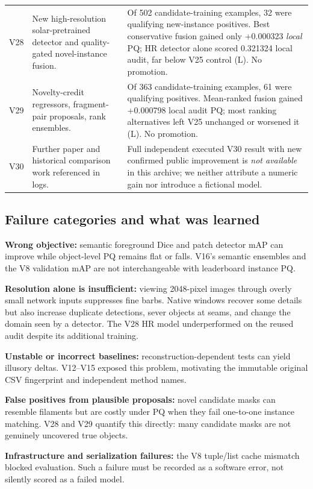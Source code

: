 \documentclass[11pt,a4paper]{article}
\begin{document}
\begin{longtable}{p{}p{}p{}}
V28 & New high-resolution solar-pretrained detector and quality-gated novel-instance fusion. & Of 502 candidate-training examples, 32 were qualifying new-instance positives. Best conservative fusion gained only +0.000323 \emph{local} PQ; HR detector alone scored 0.321324 local audit, far below V25 control (L). No promotion.\\
V29 & Novelty-credit regressors, fragment-pair proposals, rank ensembles. & Of 363 candidate-training examples, 61 were qualifying positives. Mean-ranked fusion gained +0.000798 local audit PQ; most ranking alternatives left V25 unchanged or worsened it (L). No promotion.\\
V30 & Further paper and historical comparison work referenced in logs. & Full independent executed V30 result with new confirmed public improvement is \emph{not available} in this archive; we neither attribute a numeric gain nor introduce a fictional model.\\
\bottomrule
\end{longtable}

\subsection{Failure categories and what was learned}
\textbf{Wrong objective:} semantic foreground Dice and patch detector mAP can improve while object-level PQ remains flat or falls. V16's semantic ensembles and the V8 validation mAP are not interchangeable with leaderboard instance PQ.

\textbf{Resolution alone is insufficient:} viewing 2048-pixel images through overly small network inputs suppresses fine barbs. Native windows recover some details but also increase duplicate detections, sever objects at seams, and change the domain seen by a detector. The V28 HR model underperformed on the reused audit despite its additional training.

\textbf{Unstable or incorrect baselines:} reconstruction-dependent tests can yield illusory deltas. V12--V15 exposed this problem, motivating the immutable original CSV fingerprint and independent method names.

\textbf{False positives from plausible proposals:} novel candidate masks can resemble filaments but are costly under PQ when they fail one-to-one instance matching. V28 and V29 quantify this directly: many candidate masks are not genuinely uncovered true objects.

\textbf{Infrastructure and serialization failures:} the V8 tuple/list cache mismatch blocked evaluation. Such a failure must be recorded as a software error, not silently scored as a failed model.
\end{document}
